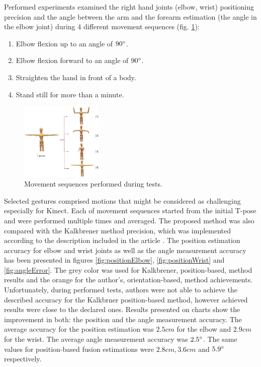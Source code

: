 \documentclass[9pt]{llncs}
\begin{document}
Performed experiments examined the right hand joints (elbow, wrist) positioning precision and the angle between the arm and the forearm estimation (the angle in the elbow joint) during 4 different movement sequences (fig. \ref{fig:poses}):
\begin{enumerate}
	\item Elbow flexion up to an angle of $90\degree$.
	\item Elbow flexion forward to an angle of $90\degree$.
	\item Straighten the hand in front of a body.
	\item Stand still for more than a minute.
\end{enumerate}

\begin{figure}[!htb]
	\centering
	\includegraphics[width=0.35\textwidth]{Fig12.eps}
	\caption{Movement sequences performed during tests.}
	\label{fig:poses}
\end{figure}


Selected gestures comprised motions that might be considered as challenging especially for Kinect. Each of movement sequences started from the initial T-pose and were performed multiple times and averaged. 
The proposed method was also compared with the Kalkbrener method precision, which was implemented according to the description included in the article \cite{Kalkbrenner2014}. 
The position estimation accuracy for elbow and wrist joints as well as the angle measurement accuracy has been presented in figures \ref{fig:positionElbow}, \ref{fig:positionWrist} and \ref{fig:angleError}. The grey color was used for Kalkbrener, position-based, method results and the orange for the author's, orientation-based, method achievements. Unfortunately, during performed tests, authors were not able to achieve the described accuracy for the Kalkbrner position-based method, however achieved results were close to the declared ones. Results presented on charts show the improvement in both: the position and the angle measurement accuracy. The average accuracy for the position estimation was $2.5 cm$ for the elbow and $2.9 cm$ for the wrist. The average angle measurement accuracy was $2.5\degree$. The same values for position-based fusion estimations were $2.8 cm, 3.6 cm$ and $5.9\degree$ respectively.
\end{document}

